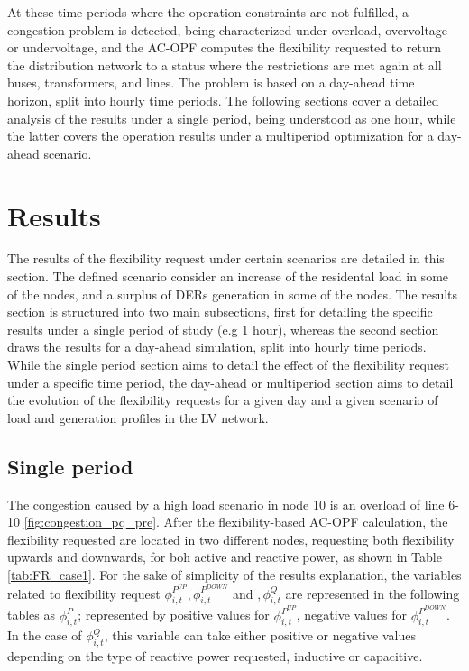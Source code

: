 At these time periods where the operation constraints are not fulfilled, a congestion problem is detected, being characterized under overload, overvoltage or undervoltage, and the AC-OPF computes the flexibility requested to return the distribution network to a status where the restrictions are met again at all buses, transformers, and lines. The problem is based on a day-ahead time horizon, split into hourly time periods. The following sections cover a detailed analysis of the results under a single period, being understood as one hour, while the latter covers the operation results under a multiperiod optimization for a day-ahead scenario.  

\section{Results}
The results of the flexibility request under certain scenarios are detailed in this section. The defined scenario consider an increase of the residental load in some of the nodes, and a surplus of DERs generation in some of the nodes. The results section is structured into two main subsections, first for detailing the specific results under a single period of study (e.g 1 hour), whereas the second section draws the results for a day-ahead simulation, split into hourly time periods. While the single period section aims to detail the effect of the flexibility request under a specific time period, the day-ahead or multiperiod section aims to detail the evolution of the flexibility requests for a given day and a given scenario of load and generation profiles in the LV network. 
\subsection{Single period}
The congestion caused by a high load scenario in node 10 is an overload of line 6-10 \ref{fig:congestion_pq_pre}. After the flexibility-based AC-OPF calculation, the flexibility requested are located in two different nodes, requesting both flexibility upwards and downwards, for boh active and reactive power, as shown in Table \ref{tab:FR_case1}. For the sake of simplicity of the results explanation, the variables related to flexibility request $\phi_{i,t}^{P^{UP}},\phi_{i,t}^{P^{DOWN}}$ and $,\phi_{i,t}^{Q}$ are represented in the following tables as $\phi_{i,t}^{P}$; represented by positive values for $\phi_{i,t}^{P^{UP}}$, negative values for $\phi_{i,t}^{P^{DOWN}}$. In the case of $\phi_{i,t}^{Q}$, this variable can take either positive or negative values depending on the type of reactive power requested, inductive or capacitive. 

